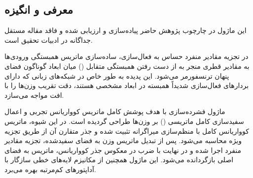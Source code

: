 \subsection{معرفی و انگیزه}
این ماژول در چارچوب پژوهش حاضر پیاده‌سازی و ارزیابی شده و فاقد مقاله مستقل جداگانه در ادبیات تحقیق است.

در تجزیه مقادیر منفرد حساس به فعال‌سازی، ساده‌سازی ماتریس همبستگی ورودی‌ها به مقادیر قطری منجر به از دست رفتن همبستگی متقابل () میان ابعاد گوناگون فضای پنهان ترنسفورمر می‌شود. این پدیده به طور خاص در شبکه‌های زبانی که دارای بردارهای فعال‌سازی شدیداً همبسته در ابعاد مشخصی هستند، دقت تقریب وزن‌ها را با افت مواجه می‌سازد.

ماژول فشرده‌سازی  با هدف پوشش کامل ماتریس کوواریانس تجربی و اعمال سفیدسازی کامل ماتریسی () بر وزن‌ها طراحی گردیده است. در این شیوه، ماتریس کوواریانس کامل با منظم‌سازی میراگرانه تثبیت شده و جذر متقارن آن از طریق تجزیه ویژه محاسبه می‌شود. پس از تبدیل ماتریس وزن به فضای سفیدشده، تجزیه مقادیر منفرد اجرا شده و در نهایت با ضرب در معکوس جذر کوواریانس، ماتریس به فضای اصلی بازگردانده می‌شود. این ماژول همچنین از مکانیزم لایه‌های خطی سازگار با آداپتورهای کم‌مرتبه  بهره می‌برد.
